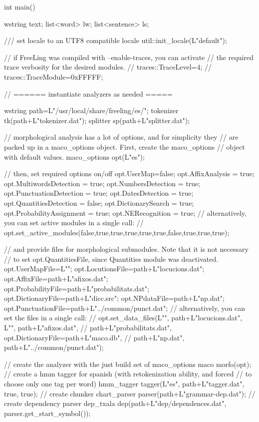 \documentclass[a4paper]{book}
\begin{document}
{\footnotesize
\begin{LSTverbatim}
int main() {
  wstring text;
  list<word> lw;
  list<sentence> ls;

  /// set locale to an UTF8 compatible locale
  util::init_locale(L"default");

  // if FreeLing was compiled with --enable-traces, you can activate
  // the required trace verbosity for the desired modules.
  //   traces::TraceLevel=4;
  //   traces::TraceModule=0xFFFFF;
  
  // ====== instantiate analyzers as needed =====

  wstring path=L"/usr/local/share/freeling/es/";
  tokenizer tk(path+L"tokenizer.dat"); 
  splitter sp(path+L"splitter.dat");
  
  // morphological analysis has a lot of options, and for simplicity they 
  // are packed up in a maco_options object. First, create the maco_options
  // object with default values.
  maco_options opt(L"es");  

  // then, set required options on/off  
  opt.UserMap=false;                 opt.AffixAnalysis = true;
  opt.MultiwordsDetection = true;    opt.NumbersDetection = true; 
  opt.PunctuationDetection = true;   opt.DatesDetection = true;
  opt.QuantitiesDetection = false;   opt.DictionarySearch = true; 
  opt.ProbabilityAssignment = true;  opt.NERecognition = true;   
  // alternatively, you can set active modules in a single call:
  // opt.set_active_modules(false,true,true,true,true,true,false,true,true,true);

  // and provide files for morphological submodules. Note that it is not necessary
  // to set opt.QuantitiesFile, since Quantities module was deactivated.
  opt.UserMapFile=L"";                 opt.LocutionsFile=path+L"locucions.dat";
  opt.AffixFile=path+L"afixos.dat";    opt.ProbabilityFile=path+L"probabilitats.dat"; 
  opt.DictionaryFile=path+L"dicc.src"; opt.NPdataFile=path+L"np.dat"; 
  opt.PunctuationFile=path+L"../common/punct.dat"; 
  // alternatively, you can set the files in a single call:
  // opt.set_data_files(L"", path+L"locucions.dat", L"", path+L"afixos.dat",
  //                   path+L"probabilitats.dat", opt.DictionaryFile=path+L"maco.db",
  //                   path+L"np.dat", path+L"../common/punct.dat");

  // create the analyzer with the just build set of maco_options
  maco morfo(opt); 
  // create a hmm tagger for spanish (with retokenization ability, and forced 
  // to choose only one tag per word)
  hmm_tagger tagger(L"es", path+L"tagger.dat", true, true); 
  // create chunker
  chart_parser parser(path+L"grammar-dep.dat");
  // create dependency parser 
  dep_txala dep(path+L"dep/dependences.dat", parser.get_start_symbol());
  
}
\end{LSTverbatim}}
\end{document}
